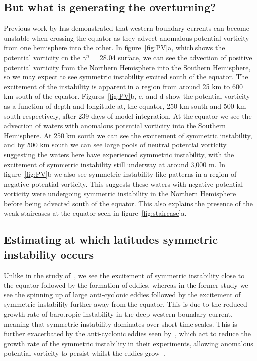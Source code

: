 \subsection{But what is generating the overturning?}
 Previous work by \citet{Goldsworth2021} has demonstrated that western boundary currents can become unstable when crossing the equator as they advect anomalous potential vorticity from one hemisphere into the other. In figure~\ref{fig:PV}a, which shows the potential vorticity on the $\gamma^n$ = 28.04 surface, we can see the advection of positive potential vorticity from the Northern Hemisphere into the Southern Hemisphere, so we may expect to see symmetric instability excited south of the equator. The excitement of the instability is apparent in a region from around 25 km to 600 km south of the equator. Figures~\ref{fig:PV}b, c, and d show the potential vorticity as a function of depth and longitude at, the equator, 250 km south and 500 km south respectively, after 239 days of model integration. At the equator we see the advection of waters with anomalous potential vorticity into the Southern Hemisphere. At 250 km south we can see the excitement of symmetric instability, and by 500 km south we can see large pools of neutral potential vorticity suggesting the waters here have experienced symmetric instability, with the excitement of symmetric instability still underway at around 3,000 m. In figure~\ref{fig:PV}b we also see symmetric instability like patterns in a region of negative potential vorticity. This suggests these waters with negative potential vorticity were undergoing symmetric instability in the Northern Hemisphere  before being advected south of the equator. This also explains the presence of the weak staircases at the equator seen in figure~\ref{fig:staircase}a.

\subsection{Estimating at which latitudes symmetric instability occurs}
\label{sec:relation2nbc}
Unlike in the study of~\citet{Goldsworth2021}, we see the excitement of symmetric instability close to the equator followed by the formation of eddies, whereas in the former study we see the spinning up of large anti-cyclonic eddies followed by the excitement of symmetric instability further away from the equator. This is due to the reduced growth rate of barotropic instability in the deep western boundary current, meaning that symmetric instability dominates over short time-scales. This is further exacerbated by the anti-cyclonic eddies seen by~\citet{Goldsworth2021}, which act to reduce the growth rate of the symmetric instability in their experiments, allowing anomalous potential vorticity to persist whilst the eddies grow~\citep{Buckingham2021}. 

